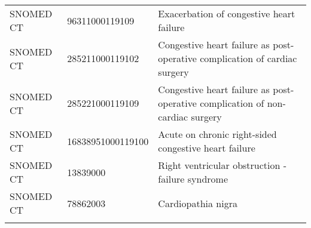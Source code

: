 \begin{longtable}{p{}p{}p{}}
  SNOMED CT & 96311000119109 & Exacerbation of congestive heart failure \\ 
  SNOMED CT & 285211000119102 & Congestive heart failure as post-operative complication of cardiac surgery \\ 
  SNOMED CT & 285221000119109 & Congestive heart failure as post-operative complication of non-cardiac surgery \\ 
  SNOMED CT & 16838951000119100 & Acute on chronic right-sided congestive heart failure \\ 
  SNOMED CT & 13839000 & Right ventricular obstruction - failure syndrome \\ 
  SNOMED CT & 78862003 & Cardiopathia nigra \\ 
  \hline
\label{tab:codes_heart-failure}
\end{longtable}
